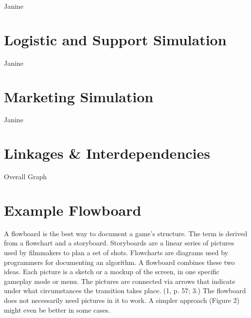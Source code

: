 \documentclass[11pt,titlepage,oneside,openany]{book}
\begin{document}
Janine\ \\


\section{Logistic and Support Simulation}
Janine\ \\




\section{Marketing Simulation}
Janine\ \\











\section{Linkages \& Interdependencies}
\label{sec:link}
Overall Graph

\section{Example Flowboard}
A flowboard is the best way to document a game’s structure. The term is derived
from a flowchart and a storyboard. Storyboards are a linear series of pictures
used by filmmakers to plan a set of shots. Flowcharts are diagrams used
by programmers for documenting an algorithm. A flowboard combines these
two ideas. Each picture is a sketch or a mockup of the screen, in one specific
gameplay mode or menu. The pictures are connected via arrows that indicate
under what circumstances the transition takes place. (1, p. 57; 3.) The flowboard
does not necessarily need pictures in it to work. A simpler approach (Figure
2) might even be better in some cases.
\end{document}
